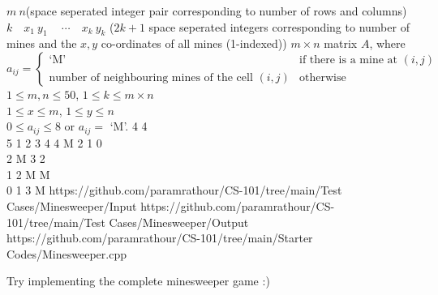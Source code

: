 \documentclass[../../Problems]{subfiles}
\begin{document}
\begin{testcasesMore}
	{%
	$m\ n$\hfill(space seperated integer pair corresponding to number of rows and columns)\\$k\quad x_1\ y_1\ \quad\cdots\quad x_{k}\ y_{k}$ \hfill($2k+1$ space seperated integers corresponding to number of mines and the $x,y$ co-ordinates of all mines (1-indexed))}
	{$m\times n$ matrix $A$, where $a_{ij}=\begin{cases}
		\text{`M'}& \text{if there is a mine at $(i,j)$} \\
		\text{number of neighbouring mines of the cell $(i,j)$} & \text{otherwise}
	\end{cases}$}
	{$1 \leq m,n \leq 50$, $1 \leq k \leq m\times n$\\$1 \leq x \leq m$, $1 \leq y \leq n$\\$0 \leq a_{ij} \leq 8$ or $a_{ij}=$ `M'.}%
	{4 4\\5 1  2  3 4 4}
	{M 2 1 0\\	2 M 3 2 \\	1 2 M M \\	0 1 3 M}
	{https://github.com/paramrathour/CS-101/tree/main/Test Cases/Minesweeper/Input}
	{https://github.com/paramrathour/CS-101/tree/main/Test Cases/Minesweeper/Output}
	{https://github.com/paramrathour/CS-101/tree/main/Starter Codes/Minesweeper.cpp}
\end{testcasesMore}
\begin{note}
	Try implementing the complete minesweeper game :)
\end{note}
\end{document}
